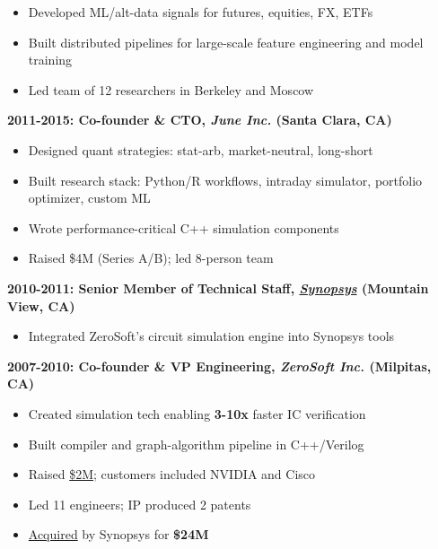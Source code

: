 \documentclass[10pt, letterpaper]{article}
\providecommand{\tightlist}{%
\setlength{\itemsep}{0pt}
\setlength{\parskip}{0pt}}
\begin{document}
  \begin{itemize}
    \tightlist

    \item Developed ML/alt-data signals for futures, equities, FX, ETFs

    \item Built distributed pipelines for large-scale feature engineering
      and model training

    \item Led team of 12 researchers in Berkeley and Moscow
  \end{itemize}

  \textbf{2011-2015: Co-founder \& CTO, \emph{June Inc.} (Santa Clara, CA)}

  \begin{itemize}
    \tightlist

    \item Designed quant strategies: stat-arb, market-neutral, long-short

    \item Built research stack: Python/R workflows, intraday simulator,
      portfolio optimizer, custom ML

    \item Wrote performance-critical C++ simulation components

    \item Raised \$4M (Series A/B); led 8-person team
  \end{itemize}

  \textbf{2010-2011: Senior Member of Technical Staff,
  \href{https://www.synopsys.com/}{\emph{Synopsys}} (Mountain View, CA)}

  \begin{itemize}
    \tightlist

    \item Integrated ZeroSoft's circuit simulation engine into Synopsys tools
  \end{itemize}

  \textbf{2007-2010: Co-founder \& VP Engineering, \emph{ZeroSoft Inc.} (Milpitas,
  CA)}

  \begin{itemize}
    \tightlist

    \item Created simulation tech enabling \textbf{3-10x} faster IC
      verification

    \item Built compiler and graph-algorithm pipeline in C++/Verilog

    \item Raised \href{https://www.crunchbase.com/organization/zerosoft}{\$2M};
      customers included NVIDIA and Cisco

    \item Led 11 engineers; IP produced 2 patents

    \item \href{https://mergr.com/synopsys-acquires-zerosoft}{Acquired} by
      Synopsys for \textbf{\$24M}
  \end{itemize}
\end{document}
